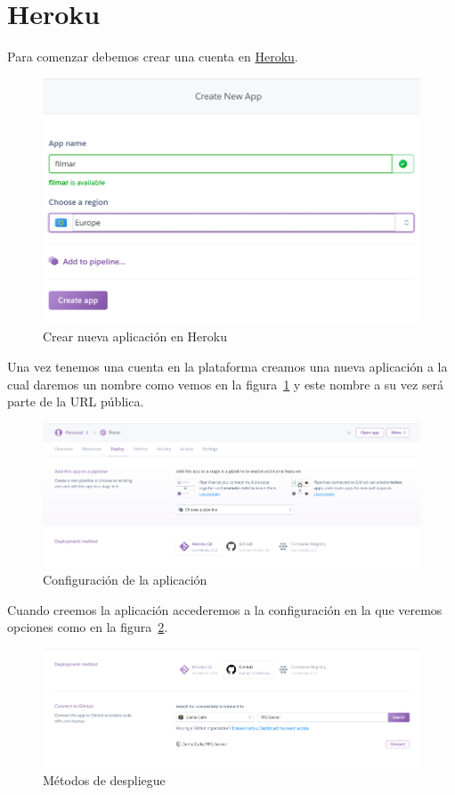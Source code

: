 \section{Heroku}
\label{app:heroku}
Para comenzar debemos crear una cuenta en \href{https://www.heroku.com/}{Heroku}.
\begin{figure}[H]
    \centering
    \includegraphics[width=6in]{figures/chapter-4/heroku_1.png}
    \caption{Crear nueva aplicación en Heroku}
    \label{fig:heroku_1}
\end{figure}
Una vez tenemos una cuenta en la plataforma creamos una nueva aplicación a la cual daremos un nombre como vemos en la figura~\ref{fig:heroku_1} y este nombre a su vez será parte de la URL pública.
\begin{figure}[H]
    \centering
    \includegraphics[width=6in]{figures/chapter-4/heroku_2.png}
    \caption{Configuración de la aplicación}
    \label{fig:heroku_2}
\end{figure}
Cuando creemos la aplicación accederemos a la configuración en la que veremos opciones como en la figura~\ref{fig:heroku_2}.
\begin{figure}[H]
    \centering
    \includegraphics[width=6in]{figures/chapter-4/heroku_3.png}
    \caption{Métodos de despliegue}
    \label{fig:heroku_3}
\end{figure}
